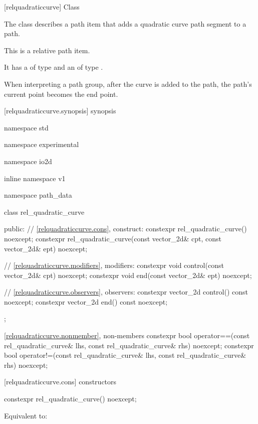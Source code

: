  [relquadraticcurve] {Class }%

\pnum
{}%
The class  describes a path item that adds a quadratic \bezierlocal curve path segment to a path.

\pnum
This is a relative path item.

\pnum
It has a  of type  and an  of type .

\pnum
When interpreting a path group, after the curve is added to the path, the path's current point becomes the end point.


 [relquadraticcurve.synopsis] { synopsis}%

\begin{codeblock}
namespace std { namespace experimental { namespace io2d { inline namespace v1 {
  namespace path_data {
    class rel_quadratic_curve {
    public:
      // \ref{relquadraticcurve.cons}, construct:
      constexpr rel_quadratic_curve() noexcept;
      constexpr rel_quadratic_curve(const vector_2d& cpt, const vector_2d& ept)
        noexcept;

      // \ref{relquadraticcurve.modifiers}, modifiers:
      constexpr void control(const vector_2d& cpt) noexcept;
      constexpr void end(const vector_2d& ept) noexcept;

      // \ref{relquadraticcurve.observers}, observers:
      constexpr vector_2d control() const noexcept;
      constexpr vector_2d end() const noexcept;
    };
    
    \ref{relquadraticcurve.nonmember}, non-members
    constexpr bool operator==(const rel_quadratic_curve& lhs,
      const rel_quadratic_curve& rhs) noexcept;
    constexpr bool operator!=(const rel_quadratic_curve& lhs,
      const rel_quadratic_curve& rhs) noexcept;
  }
} } } }
\end{codeblock}

 [relquadraticcurve.cons] { constructors}%

%
\begin{itemdecl}
constexpr rel_quadratic_curve() noexcept;
\end{itemdecl}
\begin{itemdescr}
\pnum
\effects
Equivalent to: 
\end{itemdescr}

